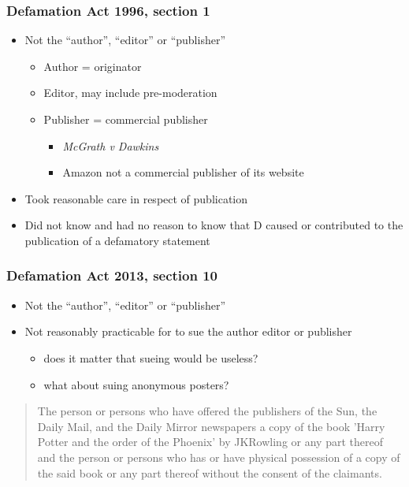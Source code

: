 \documentclass[ignorenonframetext,]{beamer}
\begin{document}
\begin{frame}
\frametitle{Defamation Act 1996, section 1}

\begin{itemize}
\item Not the ``author'', ``editor'' or ``publisher''
  \begin{itemize}
  \item Author = originator
  \item Editor, may include pre-moderation
  \item Publisher = commercial publisher
    \begin{itemize}
    \item {\it McGrath v Dawkins}
    \item Amazon not a commercial publisher of its website
    \end{itemize}
  \end{itemize}
\item Took reasonable care in respect of publication
\item Did not know and had no reason to know that D caused or
  contributed to the publication of a defamatory statement
\end{itemize}

\end{frame}

\begin{frame}
  \frametitle{Defamation Act 2013, section 10}
  \begin{itemize}
  \item Not the ``author'', ``editor'' or ``publisher''
  \item Not reasonably practicable for to sue the author editor or publisher
    \begin{itemize}
    \item does it matter that sueing would be useless?
    \item what about suing anonymous posters?
    \end{itemize}
  \end{itemize}
\end{frame}

\begin{frame}
  \begin{quote}
     The person or persons who have offered the publishers of the Sun, the Daily Mail, and the Daily Mirror newspapers a copy of the book 'Harry Potter and the order of the Phoenix' by JKRowling or any part thereof and the person or persons who has or have physical possession of a copy of the said book or any part thereof without the consent of the claimants.
  \end{quote}
\end{frame}
\end{document}
